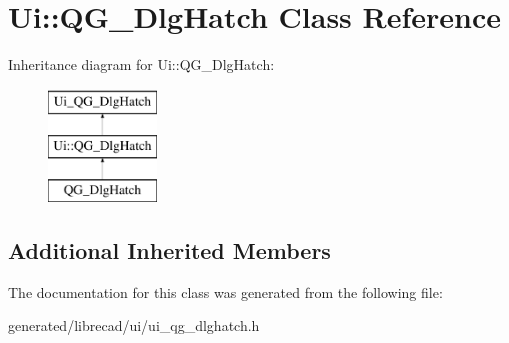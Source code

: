 \hypertarget{classUi_1_1QG__DlgHatch}{\section{Ui\-:\-:Q\-G\-\_\-\-Dlg\-Hatch Class Reference}
\label{classUi_1_1QG__DlgHatch}
}
Inheritance diagram for Ui\-:\-:Q\-G\-\_\-\-Dlg\-Hatch\-:\begin{figure}[H]
\begin{center}
\leavevmode
\includegraphics[height=3.000000cm]{classUi_1_1QG__DlgHatch}
\end{center}
\end{figure}
\subsection*{Additional Inherited Members}


The documentation for this class was generated from the following file\-:\begin{DoxyCompactItemize}
\item 
generated/librecad/ui/ui\-\_\-qg\-\_\-dlghatch.\-h\end{DoxyCompactItemize}
